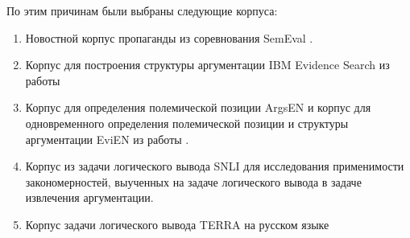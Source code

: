 По этим причинам были выбраны следующие корпуса:
\begin{enumerate}
    \item Новостной корпус пропаганды из соревнования SemEval \cite{da2020semeval}.
    \item Корпус для построения структуры аргументации IBM Evidence Search из работы  \cite{shnarch2018will}
    \item Корпус для определения полемической позиции ArgsEN и корпус для одновременного определения полемической позиции и структуры аргументации EviEN из работы \cite{toledo2020multilingual}.
    \item Корпус из задачи логического вывода SNLI \cite{snli:emnlp2015} для исследования применимости закономерностей, выученных на задаче логического вывода в задаче извлечения аргументации.
    \item Корпус задачи логического вывода TERRA на русском языке
\end{enumerate}


